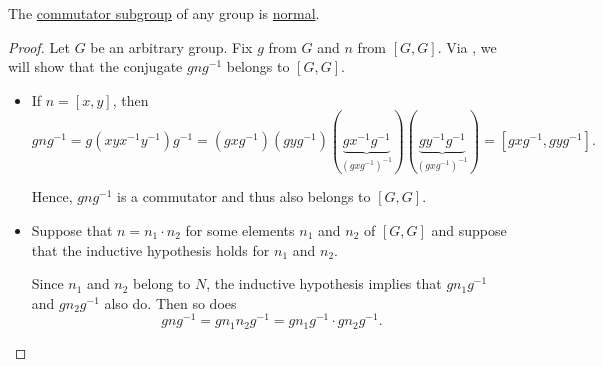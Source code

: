 \begin{proposition}\label{thm:commutator_subgroup_is_normal}
  The \hyperref[def:group_commutator]{commutator subgroup} of any group is \hyperref[def:normal_subgroup]{normal}.
\end{proposition}
\begin{proof}
  Let \( G \) be an arbitrary group. Fix \( g \) from \( G \) and \( n \) from \( [G, G] \). Via , we will show that the conjugate \( g n g^{-1} \) belongs to \( [G, G] \).

  \begin{itemize}
    \item If \( n = [x, y] \), then
    \begin{equation*}
      g n g^{-1}
      =
      g(xyx^{-1}y^{-1})g^{-1}
      =
      (gxg^{-1}) (gyg^{-1}) (\underbrace{gx^{-1}g^{-1}}_{(gxg^{-1})^{-1}}) (\underbrace{gy^{-1}g^{-1}}_{(gxg^{-1})^{-1}})
      =
      [gxg^{-1}, gyg^{-1}].
    \end{equation*}

    Hence, \( gng^{-1} \) is a commutator and thus also belongs to \( [G, G] \).

    \item Suppose that \( n = n_1 \cdot n_2 \) for some elements \( n_1 \) and \( n_2 \) of \( [G, G] \) and suppose that the inductive hypothesis holds for \( n_1 \) and \( n_2 \).

    Since \( n_1 \) and \( n_2 \) belong to \( N \), the inductive hypothesis implies that \( g n_1 g^{-1} \) and \( g n_2 g^{-1} \) also do. Then so does
    \begin{equation*}
      gng^{-1}
      =
      g n_1 n_2 g^{-1}
      =
      g n_1 g^{-1} \cdot g n_2 g^{-1}.
    \end{equation*}
  \end{itemize}
\end{proof}

